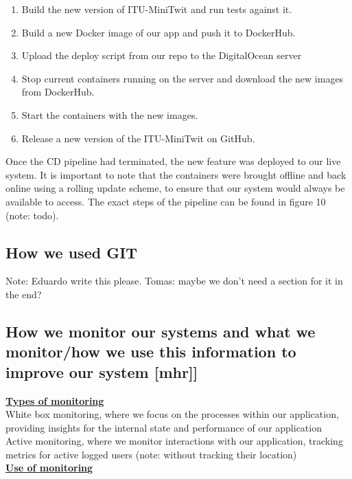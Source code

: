 \documentclass{article}
\begin{document}
\begin{enumerate}
    \item Build the new version of ITU-MiniTwit and run tests against it.
    \item Build a new Docker image of our app and push it to DockerHub.
    \item Upload the deploy script from our repo to the DigitalOcean server
    \item Stop current containers running on the server and download the new images from DockerHub.
    \item Start the containers with the new images.
    \item Release a new version of the ITU-MiniTwit on GitHub.
\end{enumerate}

Once the CD pipeline had terminated, the new feature was deployed to our live system. It is important to note that the containers were brought offline and back online using a rolling update scheme, to ensure that our system would always be available to access. The exact steps of the pipeline can be found in figure 10 (note: todo).

\subsection{How we used GIT}
Note: Eduardo write this please. Tomas: maybe we don't need a section for it in the end?

\clearpage

\subsection{How we monitor our systems and what we monitor/how we use this information to improve our system [mhr]]}

\noindent \textbf{\underline{Types of monitoring}} 
\\White box monitoring, where we focus on the processes within our application, providing insights for the internal state and performance of our application\\
Active monitoring, where we monitor interactions with our application, tracking metrics for active logged users (note: without tracking their location)
\\
\noindent \textbf{\underline{Use of monitoring}} 
\end{document}
